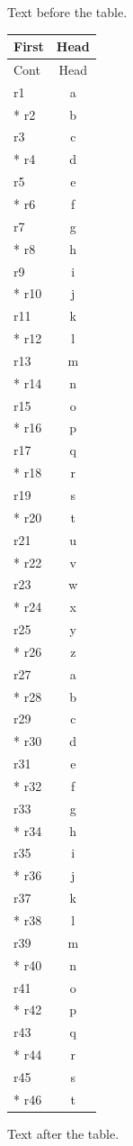 \documentclass[12pt]{article}
\begin{document}
Text before the table.

\begin{longtable}{lc}
\hline First & Head\\\hline
\endfirsthead
\hline Cont & Head\\\hline
\endhead
\hline
\endfoot
\hline\hline
\endlastfoot
r1 & a\\*
r2 & b\\
r3 & c\\*
r4 & d\\
r5 & e\\*
r6 & f\\
r7 & g\\*
r8 & h\\
r9 & i\\*
r10 & j\\
r11 & k\\*
r12 & l\\
r13 & m\\*
r14 & n\\
r15 & o\\*
r16 & p\\
r17 & q\\*
r18 & r\\
r19 & s\\*
r20 & t\\
r21 & u\\*
r22 & v\\
r23 & w\\*
r24 & x\\
r25 & y\\*
r26 & z\\
r27 & a\\*
r28 & b\\
r29 & c\\*
r30 & d\\
r31 & e\\*
r32 & f\\
r33 & g\\*
r34 & h\\
r35 & i\\*
r36 & j\\
r37 & k\\*
r38 & l\\
r39 & m\\*
r40 & n\\
r41 & o\\*
r42 & p\\
r43 & q\\*
r44 & r\\
r45 & s\\*
r46 & t\\
\end{longtable}

Text after the table.
\end{document}
